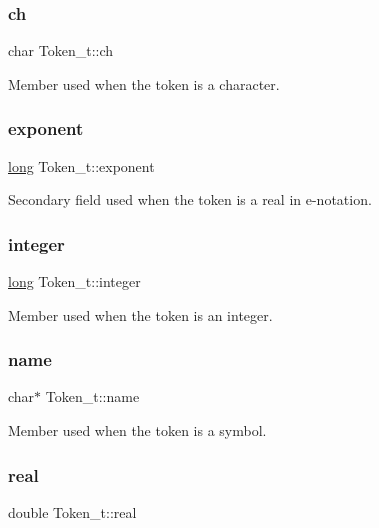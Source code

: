 \subsubsection{\texorpdfstring{ch}{ch}}
{\footnotesize\ttfamily char Token\+\_\+t\+::ch}

Member used when the token is a character. \mbox{\label{struct_token__t_a33321cc49d845e5502511b1e5b3ab7a5}} 
\subsubsection{\texorpdfstring{exponent}{exponent}}
{\footnotesize\ttfamily \hyperlink{lp__lib_8h_ad3500e0f98a49bb08992451a297ce6a6}{long} Token\+\_\+t\+::exponent}

Secondary field used when the token is a real in e-\/notation. \mbox{\label{struct_token__t_abea646fe4ec1c61ea6acfddb790e098b}} 
\subsubsection{\texorpdfstring{integer}{integer}}
{\footnotesize\ttfamily \hyperlink{lp__lib_8h_ad3500e0f98a49bb08992451a297ce6a6}{long} Token\+\_\+t\+::integer}

Member used when the token is an integer. \mbox{\label{struct_token__t_af809303f4d62262f2f5470022be688d8}} 
\subsubsection{\texorpdfstring{name}{name}}
{\footnotesize\ttfamily char$\ast$ Token\+\_\+t\+::name}

Member used when the token is a symbol. \mbox{\label{struct_token__t_a17b735b0baa2d43fd6088d31a770f7b1}} 
\subsubsection{\texorpdfstring{real}{real}}
{\footnotesize\ttfamily double Token\+\_\+t\+::real}

